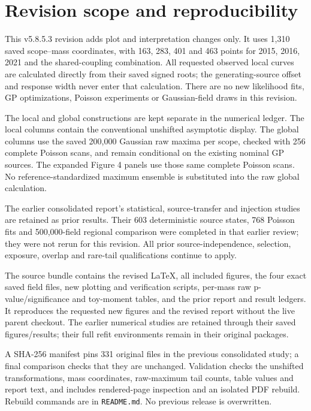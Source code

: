\section{Revision scope and reproducibility}
This v5.8.5.3 revision adds plot and interpretation changes only. It uses 1,310 saved scope--mass coordinates, with 163, 283, 401 and 463 points for 2015, 2016, 2021 and the shared-coupling combination. All requested observed local curves are calculated directly from their saved signed roots; the generating-source offset and response width never enter that calculation. There are no new likelihood fits, GP optimizations, Poisson experiments or Gaussian-field draws in this revision.

The local and global constructions are kept separate in the numerical ledger. The local columns contain the conventional unshifted asymptotic display. The global columns use the saved 200,000 Gaussian raw maxima per scope, checked with 256 complete Poisson scans, and remain conditional on the existing nominal GP sources. The expanded Figure 4 panels use those same complete Poisson scans. No reference-standardized maximum ensemble is substituted into the raw global calculation.

The earlier consolidated report's statistical, source-transfer and injection studies are retained as prior results. Their 603 deterministic source states, 768 Poisson fits and 500,000-field regional comparison were completed in that earlier review; they were not rerun for this revision. All prior source-independence, selection, exposure, overlap and rare-tail qualifications continue to apply.

The source bundle contains the revised LaTeX, all included figures, the four exact saved field files, new plotting and verification scripts, per-mass raw p-value/significance and toy-moment tables, and the prior report and result ledgers. It reproduces the requested new figures and the revised report without the live parent checkout. The earlier numerical studies are retained through their saved figures/results; their full refit environments remain in their original packages.

A SHA-256 manifest pins 331 original files in the previous consolidated study; a final comparison checks that they are unchanged. Validation checks the unshifted transformations, mass coordinates, raw-maximum tail counts, table values and report text, and includes rendered-page inspection and an isolated PDF rebuild. Rebuild commands are in \texttt{README.md}. No previous release is overwritten.
